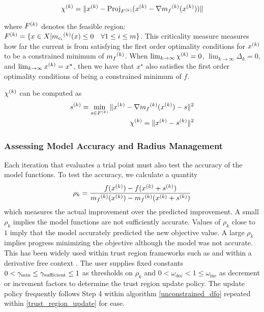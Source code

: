 \begin{align*}
{\chi^{(k)}} = \|{x^{(k)}} - \text{Proj}_{{F}^{(k)}}({x^{(k)}}- \nabla {{m}_f}^{(k)}({x^{(k)}}))\|
\end{align*}

where ${F}^{(k)}$ denotes the feasible region: ${F}^{(k)} = \{x \in X | {{m}_{c_i}}^{(k)}(x) \le 0 \quad \forall 1 \le i \le m \}$.
This criticality measure measures how far the current is from satisfying the first order optimality conditions for ${x^{(k)}}$ to be a constrained minimum of ${{m}_f}^{(k)}$.
When $ \lim_{k\to\infty} {\chi^{(k)}} = 0$, $\lim_{k\to\infty}\Delta_k = 0$, and $\lim_{k\to\infty}{x^{(k)}} = x^{\star}$, then we have that $x^{\star}$ also satisfies the first order optimality conditions of being a constrained minimum of $f$.


${\chi^{(k)}}$ can be computed as 
\begin{align}
\label{critical}
{{s}^{(k)}} = \min_{s \in {F}^{(k)}} \|{x^{(k)}} - \nabla {{m}_f}^{(k)}({x^{(k)}}) - s\|^2 \\
{\chi^{(k)}} = \|{x^{(k)}} - {{s}^{(k)}} \|^2 \\
\end{align}



\subsubsection{Assessing Model Accuracy and Radius Management}

Each iteration that evaluates a trial point must also test the accuracy of the model functions.
To test the accuracy, we calculate a quantity
\begin{equation}
\label{rho}
\rho_k = \frac{f({x^{(k)}}) - f({x^{(k)}}+{{s}^{(k)}})}{{{m}_f}^{(k)}({x^{(k)}}) - {{m}_f}^{(k)}({x^{(k)}}+{{s}^{(k)}})}
\end{equation}
which measures the actual improvement over the predicted improvement.
A small $\rho_k$ implies the model functions are not sufficiently accurate.
Values of $\rho_k$ close to $1$ imply that the model accurately predicted the new objective value.
A large $\rho_k$ implies progress minimizing the objective although the model was not accurate.
This has been widely used within trust region frameworks such as \cite{Conn:2000:TM:357813} and within a derivative free context \cite{DUMMY:intro_book}.
The user supplies fixed constants $0 < \gamma_{\text{min}} \le \gamma_{\text{sufficient}} \le 1$ as thresholds on $\rho_k$ and $0 < \omega_{\text{dec}} < 1 \le \omega_{\text{inc}}$ as decrement or increment factors to determine the trust region update policy.
The update policy frequently follows Step 4 within algorithm \cref{unconstrained_dfo} repeated within \cref{trust_region_update} for ease.

